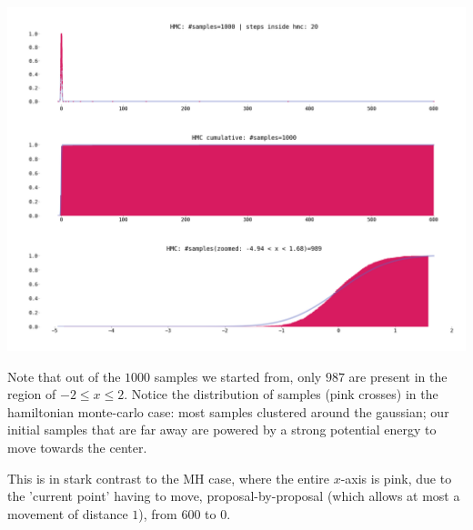 \documentclass[titlepage]{article}
\newcommand{\p}{\mathbf{p}}
\newcommand{\q}{\mathbf{q}}
\newcommand{\m}{\mathbf{m}}
\begin{document}
\includegraphics[width=\textwidth]{mcmc-hmc-1d-exp-startx-600.png}


Note that out of the $1000$ samples we started from, only $987$ are present
in the region of $-2 \leq x \leq 2$. Notice the distribution of samples
(pink crosses) in the hamiltonian monte-carlo case: most samples clustered around the gaussian;
our initial samples that are far away are powered by a strong potential energy
to move towards the center.

This is in stark contrast to the MH case, where the entire $x$-axis is pink,
due to the 'current point' having to move, proposal-by-proposal (which allows
at most a movement of distance $1$), from $600$ to $0$.


% 
% 
% 
% 
% 
% 
% 
\end{document}
